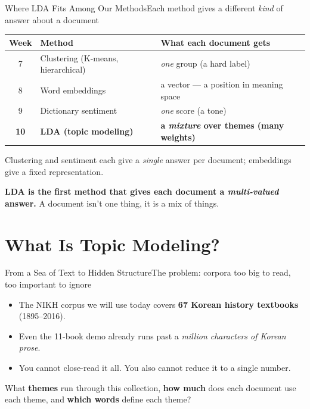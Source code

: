 \documentclass[aspectratio=169,10pt]{beamer}
\begin{document}
\begin{frame}{Where LDA Fits Among Our Methods}{Each method gives a different \emph{kind} of answer about a document}
  \begin{center}
    \small
    \begin{tabular}{@{}c l l@{}}
      \toprule
      \textbf{Week} & \textbf{Method}              & \textbf{What each document gets} \\
      \midrule
      7    & Clustering (K-means, hierarchical)   & \emph{one} group (a hard label)               \\
      8    & Word embeddings                      & a vector --- a position in meaning space       \\
      9    & Dictionary sentiment                 & \emph{one} score (a tone)                      \\
      \textbf{10} & \textbf{LDA (topic modeling)} & \textbf{a \emph{mixture} over themes (many weights)} \\
      \bottomrule
    \end{tabular}
  \end{center}

  \vspace{0.8em}
  Clustering and sentiment each give a \emph{single} answer per document; embeddings give a fixed representation.

  \vspace{0.5em}
  \textbf{LDA is the first method that gives each document a \emph{multi-valued} answer.} A document isn't one thing, it is a mix of things.
\end{frame}

\section{What Is Topic Modeling?}

\begin{frame}{From a Sea of Text to Hidden Structure}{The problem: corpora too big to read, too important to ignore}
  \begin{itemize}
    \item The NIKH corpus we will use today covers \textbf{67 Korean history textbooks} (1895--2016).
    \item Even the 11-book demo already runs past a \emph{million characters of Korean prose}.
    \item You cannot close-read it all. You also cannot reduce it to a single number.
  \end{itemize}
  \vspace{0.4em}
  \begin{callblue}
    What \textbf{themes} run through this collection, \textbf{how much} does each document use each theme,
    and \textbf{which words} define each theme?
  \end{callblue}
\end{frame}
\end{document}
